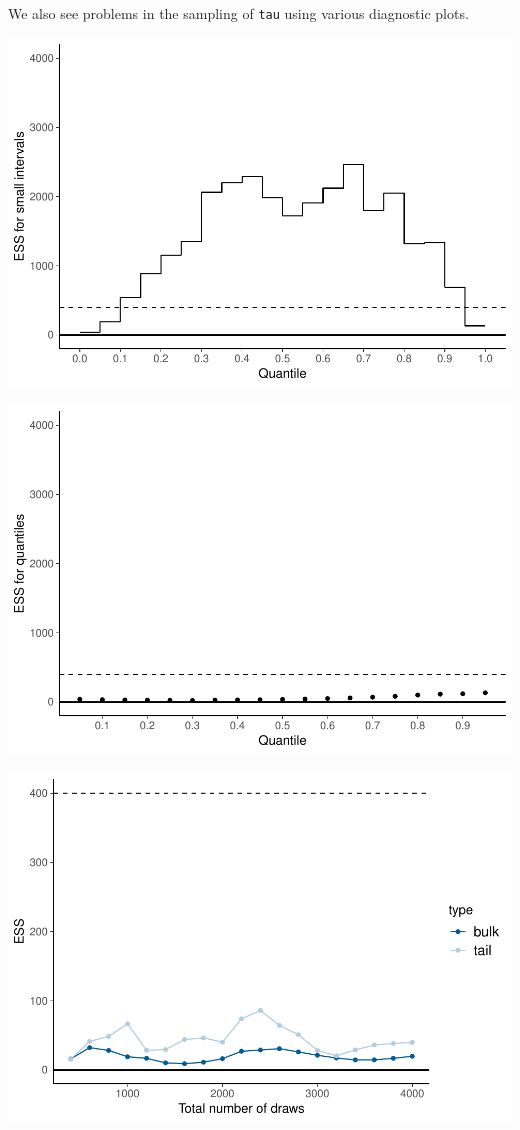 \documentclass[american,]{article}
\begin{document}
We also see problems in the sampling of \texttt{tau} using various
diagnostic plots.

\includegraphics{graphics/local-ess-jags-cp-tau-1.pdf}

\includegraphics{graphics/quantile-ess-jags-cp-tau-1.pdf}

\includegraphics{graphics/change-ess-jags-cp-tau-1.pdf}
\end{document}
